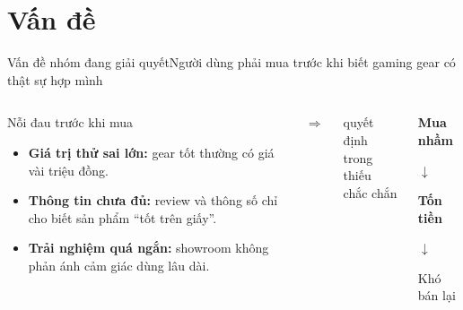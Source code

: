 \section{Vấn đề}

\begin{frame}{Vấn đề nhóm đang giải quyết}{Người dùng phải mua trước khi biết gaming gear có thật sự hợp mình}
  \vspace{.35em}
  \begin{columns}[c,onlytextwidth]
      \begin{alertblock}{Nỗi đau trước khi mua}
        \begin{itemize}
          \item \textbf{Giá trị thử sai lớn:} gear tốt thường có giá vài triệu đồng.
          \item \textbf{Thông tin chưa đủ:} review và thông số chỉ cho biết sản phẩm ``tốt trên giấy''.
          \item \textbf{Trải nghiệm quá ngắn:} showroom không phản ánh cảm giác dùng lâu dài.
        \end{itemize}
      \end{alertblock}

      \centering
      {\color{mutuxOrange}\fontsize{27}{29}\selectfont$\Longrightarrow$}\par
      \vspace{.2em}
      {\scriptsize\color{cookieMuted}quyết định trong\\thiếu chắc chắn}

      \begin{cookiecard}[title=Hệ quả]
        \centering
        {\Large\bfseries Mua nhầm}\par
        \vspace{.3em}
        {\color{mutuxOrange}\large$\downarrow$}\par
        \vspace{.2em}
        {\Large\bfseries\textcolor{mutuxOrange}{Tốn tiền}}\par
        \vspace{.3em}
        {\color{mutuxOrange}\large$\downarrow$}\par
        \vspace{.2em}
        {\large Khó bán lại}
      \end{cookiecard}
  \end{columns}
\end{frame}
